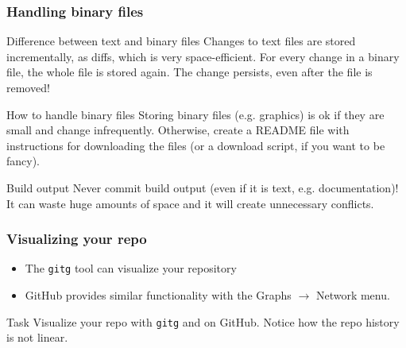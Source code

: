 \begin{frame}[fragile]
	\frametitle{Handling binary files}
	
	\begin{block}{Difference between text and binary files}
	Changes to text files are stored incrementally, as diffs, which is very space-efficient. For every change in a binary file, the whole file is stored again. The change persists, even after the file is removed!
	\end{block}
	
	\begin{block}{How to handle binary files}
	Storing binary files (e.g. graphics) is ok if they are small and change infrequently. Otherwise, create a README file with instructions for downloading the files (or a download script, if you want to be fancy).
	\end{block}
	
	\begin{block}{Build output}
	\alert{Never} commit build output (even if it is text, e.g. documentation)! It can waste \alert{huge} amounts of space and it will create unnecessary conflicts.
	\end{block}
\end{frame}


\begin{frame}

\frametitle{Visualizing your repo}

\begin{itemize}
	\item The \texttt{gitg} tool can visualize your repository
	\item GitHub provides similar functionality with the Graphs $\rightarrow$ Network menu.
\end{itemize}

\begin{block}{Task}
	Visualize your repo with \texttt{gitg} and on GitHub. Notice how the repo history is not linear. 
\end{block}

\end{frame}
